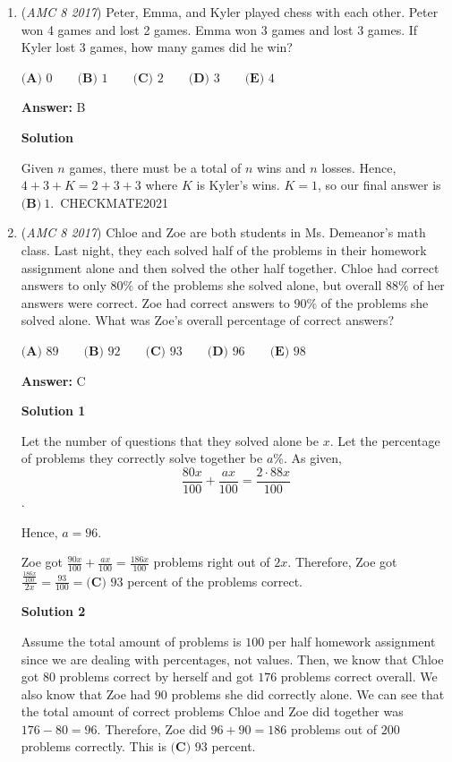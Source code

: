 \begin{enumerate}
	\item (\textit{AMC 8 2017}) Peter, Emma, and Kyler played chess with each other. Peter won 4 games and lost 2 games. Emma won 3 games and lost 3 games. If Kyler lost 3 games, how many games did he win?


 $\textbf{(A) }0\qquad\textbf{(B) }1\qquad\textbf{(C) }2\qquad\textbf{(D) }3\qquad\textbf{(E) }4$

 \textbf{Answer: }B



\textbf{Solution}

Given $n$ games, there must be a total of $n$ wins and $n$ losses. Hence, $4 + 3 + K = 2 + 3 + 3$ where $K$ is Kyler's wins. $K = 1$, so our final answer is $\boxed{\textbf{(B)}\ 1}.$~CHECKMATE2021

 


	\item (\textit{AMC 8 2017}) Chloe and Zoe are both students in Ms. Demeanor's math class. Last night, they each solved half of the problems in their homework assignment alone and then solved the other half together. Chloe had correct answers to only $80\%$ of the problems she solved alone, but overall $88\%$ of her answers were correct. Zoe had correct answers to $90\%$ of the problems she solved alone. What was Zoe's  overall percentage of correct answers?


 $\textbf{(A) }89\qquad\textbf{(B) }92\qquad\textbf{(C) }93\qquad\textbf{(D) }96\qquad\textbf{(E) }98$

 \textbf{Answer: }C



\textbf{Solution 1}

Let the number of questions that they solved alone be $x$. Let the percentage of problems they correctly solve together be $a$\%. As given, 
 \[\frac{80x}{100} + \frac{ax}{100} = \frac{2 \cdot 88x}{100}\]. 

 Hence, $a = 96$. 

 Zoe got $\frac{90x}{100} + \frac{ax}{100} = \frac{186x}{100}$ problems right out of $2x$. Therefore, Zoe got $\frac{\frac{186x}{100}}{2x} = \frac{93}{100} = \boxed{\textbf{(C) } 93}$ percent of the problems correct.

 



\textbf{Solution 2}

Assume the total amount of problems is $100$ per half homework assignment since we are dealing with percentages, not values. Then, we know that Chloe got $80$ problems correct by herself and got $176$ problems correct overall. We also know that Zoe had $90$ problems she did correctly alone. We can see that the total amount of correct problems Chloe and Zoe did together was $176-80=96$. Therefore, Zoe did $96+90=186$ problems out of $200$ problems correctly. This is $\boxed{\textbf{(C) } 93}$ percent.


\end{enumerate}
